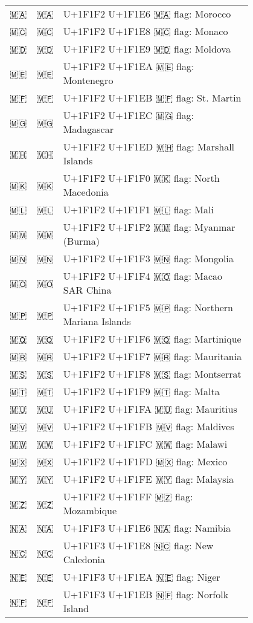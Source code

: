 \documentclass[a4paper,12pt]{ltjarticle}
\newcommand{\fontA}[1]{{\fontspec[RawFeature={mode=harf,+dist,+ccmp}]{Segoe UI Emoji} #1}}
\newcommand{\fontB}[1]{{\fontspec[RawFeature={mode=harf,+dist,+ccmp}]{Noto Color Emoji} #1}}
\begin{document}
\begin{longtable}[c]{ccp{0.8\linewidth}}
\fontA{🇲🇦}&\fontB{🇲🇦}&U+1F1F2 U+1F1E6 🇲🇦 flag: Morocco\\
\fontA{🇲🇨}&\fontB{🇲🇨}&U+1F1F2 U+1F1E8 🇲🇨 flag: Monaco\\
\fontA{🇲🇩}&\fontB{🇲🇩}&U+1F1F2 U+1F1E9 🇲🇩 flag: Moldova\\
\fontA{🇲🇪}&\fontB{🇲🇪}&U+1F1F2 U+1F1EA 🇲🇪 flag: Montenegro\\
\fontA{🇲🇫}&\fontB{🇲🇫}&U+1F1F2 U+1F1EB 🇲🇫 flag: St. Martin\\
\fontA{🇲🇬}&\fontB{🇲🇬}&U+1F1F2 U+1F1EC 🇲🇬 flag: Madagascar\\
\fontA{🇲🇭}&\fontB{🇲🇭}&U+1F1F2 U+1F1ED 🇲🇭 flag: Marshall Islands\\
\fontA{🇲🇰}&\fontB{🇲🇰}&U+1F1F2 U+1F1F0 🇲🇰 flag: North Macedonia\\
\fontA{🇲🇱}&\fontB{🇲🇱}&U+1F1F2 U+1F1F1 🇲🇱 flag: Mali\\
\fontA{🇲🇲}&\fontB{🇲🇲}&U+1F1F2 U+1F1F2 🇲🇲 flag: Myanmar (Burma)\\
\fontA{🇲🇳}&\fontB{🇲🇳}&U+1F1F2 U+1F1F3 🇲🇳 flag: Mongolia\\
\fontA{🇲🇴}&\fontB{🇲🇴}&U+1F1F2 U+1F1F4 🇲🇴 flag: Macao SAR China\\
\fontA{🇲🇵}&\fontB{🇲🇵}&U+1F1F2 U+1F1F5 🇲🇵 flag: Northern Mariana Islands\\
\fontA{🇲🇶}&\fontB{🇲🇶}&U+1F1F2 U+1F1F6 🇲🇶 flag: Martinique\\
\fontA{🇲🇷}&\fontB{🇲🇷}&U+1F1F2 U+1F1F7 🇲🇷 flag: Mauritania\\
\fontA{🇲🇸}&\fontB{🇲🇸}&U+1F1F2 U+1F1F8 🇲🇸 flag: Montserrat\\
\fontA{🇲🇹}&\fontB{🇲🇹}&U+1F1F2 U+1F1F9 🇲🇹 flag: Malta\\
\fontA{🇲🇺}&\fontB{🇲🇺}&U+1F1F2 U+1F1FA 🇲🇺 flag: Mauritius\\
\fontA{🇲🇻}&\fontB{🇲🇻}&U+1F1F2 U+1F1FB 🇲🇻 flag: Maldives\\
\fontA{🇲🇼}&\fontB{🇲🇼}&U+1F1F2 U+1F1FC 🇲🇼 flag: Malawi\\
\fontA{🇲🇽}&\fontB{🇲🇽}&U+1F1F2 U+1F1FD 🇲🇽 flag: Mexico\\
\fontA{🇲🇾}&\fontB{🇲🇾}&U+1F1F2 U+1F1FE 🇲🇾 flag: Malaysia\\
\fontA{🇲🇿}&\fontB{🇲🇿}&U+1F1F2 U+1F1FF 🇲🇿 flag: Mozambique\\
\fontA{🇳🇦}&\fontB{🇳🇦}&U+1F1F3 U+1F1E6 🇳🇦 flag: Namibia\\
\fontA{🇳🇨}&\fontB{🇳🇨}&U+1F1F3 U+1F1E8 🇳🇨 flag: New Caledonia\\
\fontA{🇳🇪}&\fontB{🇳🇪}&U+1F1F3 U+1F1EA 🇳🇪 flag: Niger\\
\fontA{🇳🇫}&\fontB{🇳🇫}&U+1F1F3 U+1F1EB 🇳🇫 flag: Norfolk Island\\

\end{longtable}
\end{document}
